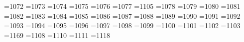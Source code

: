 =1072 %
{}=1073 %
{}=1074 %
{}=1075 %
{}=1076 %
{}=1077 %
{}=1105 %
{}=1078 %
{}=1079 %
{}=1080 %
{}=1081 %
{}=1082 %
{}=1083 %
{}=1084 %
{}=1085 %
{}=1086 %
{}=1087 %
{}=1088 %
{}=1089 %
{}=1090 %
{}=1091 %
{}=1092 %
{}=1093 %
{}=1094 %
{}=1095 %
{}=1096 %
{}=1097 %
{}=1098 %
{}=1099 %
{}=1100 %
{}=1101 %
{}=1102 %
{}=1103 %
=1169 %
{}=1108 %
{}=1110 %
{}=1111 %
{}=1118 %

